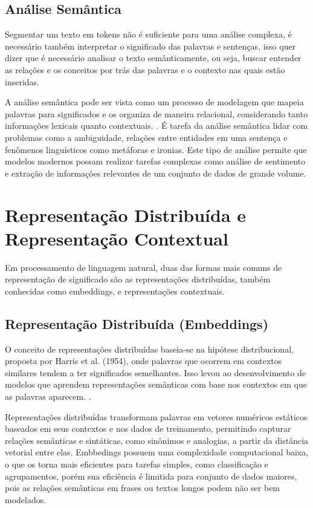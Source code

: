 \subsection{Análise Semântica}\label{subsec:nlp3}

Segmentar um texto em tokens não é suficiente para uma análise complexa, é necessário também interpretar o significado das palavras e sentenças, isso quer dizer que é necessário analisar o texto semânticamente, ou seja, buscar entender as relações e os conceitos por trás das palavras e o contexto nas quais estão inseridas.

A análise semântica pode ser vista como um processo de modelagem que mapeia palavras para significados e os organiza de maneira relacional, considerando tanto informações lexicais quanto contextuais. \cite{JurafskyMartin2023}. É tarefa da análise semântica lidar com problemas como a ambiguidade, relações entre entidades em uma sentença e fenômenos linguísticos como metáforas e ironias. Este tipo de análise permite que modelos modernos possam realizar tarefas complexas como análise de sentimento e extração de informações relevantes de um conjunto de dados de grande volume.

\section{Representação Distribuída e Representação Contextual}\label{subsec:embeddings_transformers}

Em processamento de linguagem natural, duas das formas mais comuns de representação de significado são as representações distribuídas, também conhecidas como embeddings, e representações contextuais. 

\subsection{Representação Distribuída (Embeddings)}\label{subsec:embeddings}

O conceito de representações distribuídas baseia-se na hipótese distribucional, proposta por Harris et al. (1954), onde palavras que ocorrem em contextos similares tendem a ter significados semelhantes. Isso levou ao desenvolvimento de modelos que aprendem representações semânticas com base nos contextos em que as palavras aparecem. \cite{Harris1954}.

Representações distribuídas transformam palavras em vetores numéricos estáticos baseados em seus contextos e nos dados de treinamento, permitindo capturar relações semânticas e sintáticas, como sinônimos e analogias, a partir da distância vetorial entre elas. Embbedings possuem uma complexidade computacional baixa, o que os torna mais eficientes para tarefas simples, como classificação e agrupamentos, porém sua eficiência é limitida para conjunto de dados maiores, pois as relações semânticas em frases ou textos longos podem não ser bem modelados.

